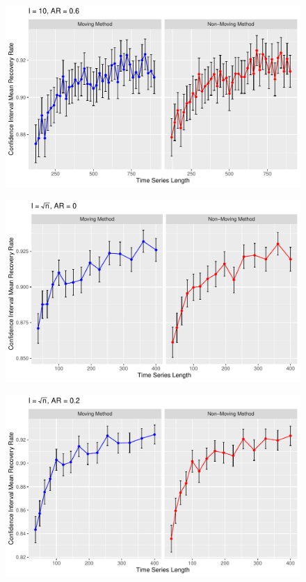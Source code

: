 \documentclass[12pt, letterpaper, titlepage]{article}
\begin{document}
\begin{figure}[tbp]
  \centering
  \includegraphics[width=\textwidth]{constant_0.6}
  \caption{}
  \label{fig:constant_0.6}
\end{figure}

\begin{figure}[tbp]
  \centering
  \includegraphics[width=\textwidth]{root_0}
  \caption{}
  \label{fig:root_norm}
\end{figure}

\begin{figure}[tbp]
  \centering
  \includegraphics[width=\textwidth]{root_0.2}
  \caption{}
  \label{fig:root_0.2}
\end{figure}
\end{document}
